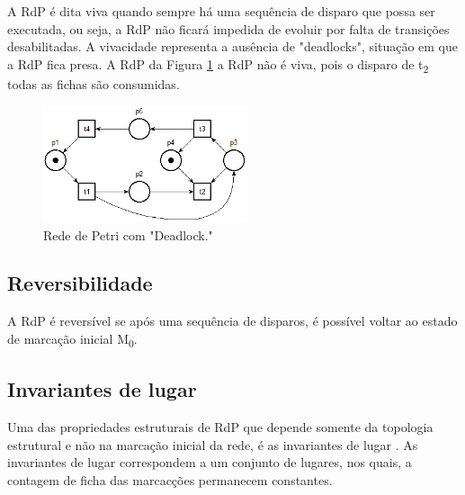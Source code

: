 A RdP \'e dita viva quando sempre h\'a uma sequ\^encia de disparo que possa ser executada, ou seja, a RdP n\~ao ficar\'a impedida de evoluir por falta de transi\c{c}\~oes desabilitadas. A vivacidade representa a aus\^encia de "deadlocks", situa\c{c}\~ao em que a RdP fica presa. A RdP da Figura \ref{fig:rdpdeadlock} a RdP n\~ao \'e viva, pois o disparo de t\textsubscript{2} todas as fichas s\~ao consumidas.

\begin{figure}[!htb]
	\caption[Rede de Petri com deadlock]{Rede de Petri com "Deadlock."}
	\label{fig:rdpdeadlock}
	\includegraphics[width=6cm]{./figuras/RDP_DEADLOCK.png}\centering
\end{figure}

\subsection{Reversibilidade}

A RdP \'e revers\'ivel se ap\'os uma sequ\^encia de disparos, \'e poss\'ivel voltar ao estado de marca\c{c}\~ao inicial M\textsubscript{0}.

\subsection{Invariantes de lugar}

Uma das propriedades estruturais de RdP que depende somente da topologia estrutural e n\~ao na marca\c{c}\~ao inicial da rede, \'e as invariantes de lugar \cite{moody1998}. As invariantes de lugar correspondem a um conjunto de lugares, nos quais, a contagem de ficha das marcac\c{c}\~oes permanecem constantes.



